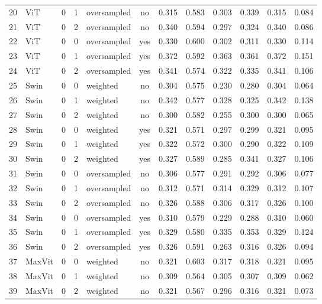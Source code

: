 \documentclass[a4paper,10pt]{book}
\begin{document}
\begin{scriptsize}
\begin{longtable}{@{}l l c c l c c c c c c c@{}}
        20 & ViT & 0 & 1 & oversampled & no & 0.315 & 0.583 & 0.303 & 0.339 & 0.315 & 0.084 \\ 
        21 & ViT & 0 & 2 & oversampled & no & 0.340 & 0.594 & 0.297 & 0.324 & 0.340 & 0.086 \\ 
        22 & ViT & 0 & 0 & oversampled & yes & 0.330 & 0.600 & 0.302 & 0.311 & 0.330 & 0.114 \\ 
        23 & ViT & 0 & 1 & oversampled & yes & 0.372 & 0.592 & 0.363 & 0.361 & 0.372 & 0.151 \\ 
        24 & ViT & 0 & 2 & oversampled & yes & 0.341 & 0.574 & 0.322 & 0.335 & 0.341 & 0.106 \\ 
        25 & Swin & 0 & 0 & weighted & no & 0.304 & 0.575 & 0.230 & 0.280 & 0.304 & 0.064 \\ 
        26 & Swin & 0 & 1 & weighted & no & 0.342 & 0.577 & 0.328 & 0.325 & 0.342 & 0.138 \\ 
        27 & Swin & 0 & 2 & weighted & no & 0.300 & 0.582 & 0.255 & 0.300 & 0.300 & 0.065 \\ 
        28 & Swin & 0 & 0 & weighted & yes & 0.321 & 0.571 & 0.297 & 0.299 & 0.321 & 0.095 \\ 
        29 & Swin & 0 & 1 & weighted & yes & 0.322 & 0.572 & 0.300 & 0.290 & 0.322 & 0.109 \\ 
        30 & Swin & 0 & 2 & weighted & yes & 0.327 & 0.589 & 0.285 & 0.341 & 0.327 & 0.106 \\ 
        31 & Swin & 0 & 0 & oversampled & no & 0.306 & 0.577 & 0.291 & 0.292 & 0.306 & 0.077 \\ 
        32 & Swin & 0 & 1 & oversampled & no & 0.312 & 0.571 & 0.314 & 0.329 & 0.312 & 0.107 \\ 
        33 & Swin & 0 & 2 & oversampled & no & 0.326 & 0.588 & 0.306 & 0.317 & 0.326 & 0.100 \\ 
        34 & Swin & 0 & 0 & oversampled & yes & 0.310 & 0.579 & 0.229 & 0.288 & 0.310 & 0.060 \\ 
        35 & Swin & 0 & 1 & oversampled & yes & 0.329 & 0.580 & 0.335 & 0.353 & 0.329 & 0.124 \\ 
        36 & Swin & 0 & 2 & oversampled & yes & 0.326 & 0.591 & 0.263 & 0.316 & 0.326 & 0.094 \\ 
        37 & MaxVit & 0 & 0 & weighted & no & 0.321 & 0.603 & 0.317 & 0.318 & 0.321 & 0.095 \\ 
        38 & MaxVit & 0 & 1 & weighted & no & 0.309 & 0.564 & 0.305 & 0.307 & 0.309 & 0.062 \\ 
        39 & MaxVit & 0 & 2 & weighted & no & 0.321 & 0.567 & 0.296 & 0.316 & 0.321 & 0.073 \\ 

\end{longtable}
\end{scriptsize}
\end{document}
